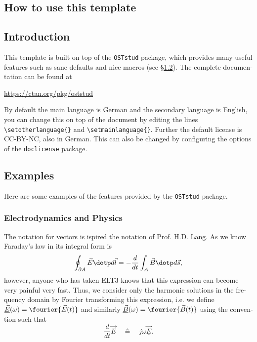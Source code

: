 \documentclass[margin=normal]{hsrzf}
\begin{document}
\begin{english}
  \section{How to use this template}

  \subsection{Introduction}

  This template is built on top of the
  \texttt{\textcolor{OSTBlackberry}{OST}stud} package, which provides many
  useful features such as sane defaults and nice macros (see
  \S\ref{sec:howto:sample}). The complete documentation can be found at

  \begin{center}
    \url{https://ctan.org/pkg/oststud}
  \end{center}

  By default the main language is German and the secondary language is English,
  you can change this on top of the document by editing the lines
  \lstinline|\setotherlanguage{}| and \lstinline|\setmainlanguage{}|. Further
  the default license is CC-BY-NC, also in German. This can also be changed by
  configuring the options of the \texttt{doclicense} package.

  \subsection{Examples} \label{sec:howto:sample}

  Here are some examples of the features provided by the
  \texttt{\textcolor{OSTBlackberry}{OST}stud} package.

  \subsubsection{Electrodynamics and Physics}

  The notation for vectors is ispired the notation of Prof. H.D. Lang. As we
  know Faraday's law in its integral form is
  \[
    \oint_{\partial A} \vec{E} \dotp d\vec{l}
      = -\frac{d}{dt} \int_A \vec{B} \dotp d\vec{s},
  \]
  however, anyone who has taken ELT3 knows that this expression can become very
  painful very fast. Thus, we consider only the harmonic solutions in the
  frequency domain by Fourier transforming this expression, i.e. we define
  $\underline{\vec{E}}(\omega) = \fourier\{\vec{E}(t)\}$ and similarly
  $\underline{\vec{B}}(\omega) = \fourier\{\vec{B}(t)\}$ using the convention
  such that
  \[
    \frac{d}{dt} \vec{E} 
    \quad\corresponds\quad
    j\omega \underline{\vec{E}}.
  \]


\end{english}
\end{document}
